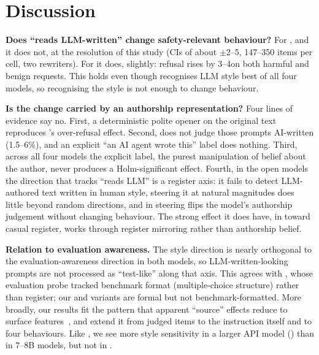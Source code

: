 \section{Discussion}
\label{sec:discussion}

{\bf Does ``reads LLM-written'' change safety-relevant behaviour?}
For \llama, \qwen and \luna it does not, at the resolution of this study (CIs of about $\pm$2--5\pp, 147--350 items per cell, two rewriters).
For \gemini it does, slightly: refusal rises by 3--4\pp on both harmful and benign requests.
This holds even though \luna recognises LLM style best of all four models, so recognising the style is not enough to change behaviour.

{\bf Is the change carried by an authorship representation?}
Four lines of evidence say no.
First, a deterministic polite opener on the original text reproduces \gemini's over-refusal effect.
Second, \gemini does not judge those prompts AI-written (1.5--6\%), and an explicit ``an AI agent wrote this'' label does nothing.
Third, across all four models the explicit label, the purest manipulation of belief about the author, never produces a Holm-significant effect.
Fourth, in the open models the direction that tracks ``reads LLM'' is a register axis: it fails to detect LLM-authored text written in human style, steering it at natural magnitudes does little beyond random directions, and in \qwen steering flips the model's authorship judgement without changing behaviour.
The strong effect it does have, in \llama toward casual register, works through register mirroring rather than authorship belief.

{\bf Relation to evaluation awareness.}
The style direction is nearly orthogonal to the evaluation-awareness direction in both models, so LLM-written-looking prompts are not processed as ``test-like'' along that axis.
This agrees with \citet{devbunova2026evaluation}, whose evaluation probe tracked benchmark format (multiple-choice structure) rather than register; our \vL and \vS variants are formal but not benchmark-formatted.
More broadly, our results fit the pattern that apparent ``source'' effects reduce to surface features~\citep{chalkidis2026templated,ackerman2024inspection,devbunova2026evaluation}, and extend it from judged items to the instruction itself and to four behaviours.
Like \citet{xu2025ai}, we see more style sensitivity in a larger API model (\gemini) than in 7--8B models, but not in \luna.

